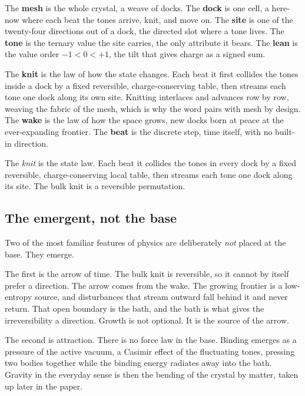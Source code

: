The \textbf{mesh} is the whole crystal, a weave of docks. The \textbf{dock} is one cell, a here-now where each beat the tones arrive, knit, and move on. The \textbf{site} is one of the twenty-four directions out of a dock, the directed slot where a tone lives. The \textbf{tone} is the ternary value the site carries, the only attribute it bears. The \textbf{lean} is the value order $-1 < 0 < +1$, the tilt that gives charge as a signed sum.

The \textbf{knit} is the law of how the state changes. Each beat it first collides the tones inside a dock by a fixed reversible, charge-conserving table, then streams each tone one dock along its own site. Knitting interlaces and advances row by row, weaving the fabric of the mesh, which is why the word pairs with mesh by design. The \textbf{wake} is the law of how the space grows, new docks born at peace at the ever-expanding frontier. The \textbf{beat} is the discrete step, time itself, with no built-in direction.

\begin{definition}
The \emph{knit} is the state law. Each beat it collides the tones in every dock by a fixed reversible, charge-conserving local table, then streams each tone one dock along its site. The bulk knit is a reversible permutation.
\end{definition}

\subsection{The emergent, not the base}

Two of the most familiar features of physics are deliberately \emph{not} placed at the base. They emerge.

The first is the arrow of time. The bulk knit is reversible, so it cannot by itself prefer a direction. The arrow comes from the wake. The growing frontier is a low-entropy source, and disturbances that stream outward fall behind it and never return. That open boundary is the bath, and the bath is what gives the irreversibility a direction. Growth is not optional. It is the source of the arrow.

The second is attraction. There is no force law in the base. Binding emerges as a pressure of the active vacuum, a Casimir effect of the fluctuating tones, pressing two bodies together while the binding energy radiates away into the bath. Gravity in the everyday sense is then the bending of the crystal by matter, taken up later in the paper.

